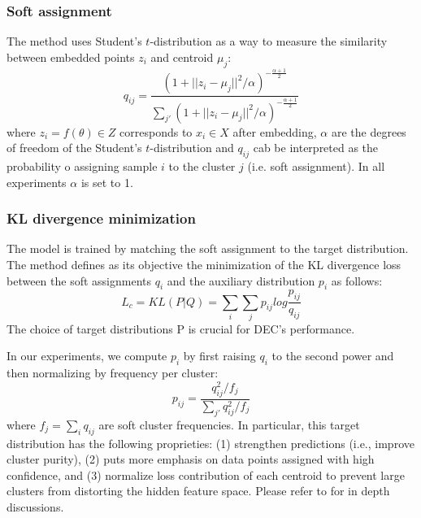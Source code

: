 \subsubsection{Soft assignment}

The method uses Student's $t$-distribution as a way to measure the similarity between embedded points $z_i$ and centroid $\mu_j$:
\begin{equation}
    q_{i j} = \frac{(1+||z_i - \mu_j||^2/\alpha)^{-\frac{\alpha + 1}{2}}}{\sum_{j'}(1+||z_i - \mu_j||^2/\alpha)^{-\frac{\alpha + 1}{2}}}
\end{equation}
where $z_i = f(\theta) \in Z$ corresponds to $x_i \in X$ after embedding, $\alpha$ are the degrees of freedom of the Student's $t$-distribution and $q_{i j}$ cab be interpreted as the probability o assigning sample $i$ to the cluster $j$ (i.e. soft assignment). In all experiments $\alpha$ is set to 1.


\subsubsection{KL divergence minimization}

The model is trained by matching the soft assignment to the target distribution. The method defines as its objective the minimization of the KL divergence loss between the soft assignments $q_i$ and the auxiliary distribution $p_i$ as follows:
\begin{equation}
    L_c = KL(P | Q) = \sum_i\sum_j p_{i j} log\frac{p_{i j}}{q_{i j}}
    \label{L_c}
\end{equation}
The choice of target distributions P is crucial for DEC’s performance. 


In our experiments, we compute $p_i$ by first raising $q_i$ to the second power and then normalizing by frequency per cluster:
\begin{equation}
    p_{i j} = \frac{q_{i j}^2 / f_j}{\sum_{j'} q_{i j}^2 / f_j} 
\end{equation}
where $f_j = \sum_i q_{i j}$ are soft cluster frequencies. In particular, this target distribution has the following proprieties: (1) strengthen predictions (i.e., improve cluster purity), (2) puts more emphasis on data points assigned with high confidence, and (3) normalize loss contribution of each centroid to prevent large clusters from distorting
the hidden feature space. Please refer to \cite{xie2016unsupervised} for in depth discussions.

